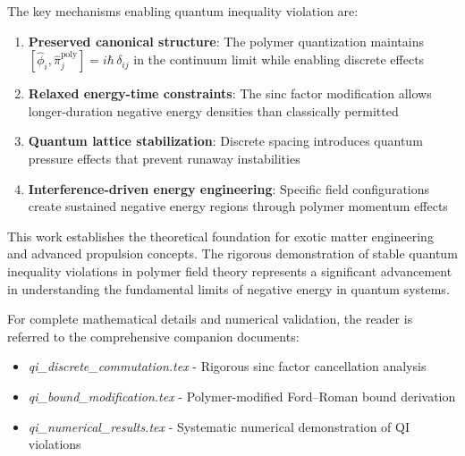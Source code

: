 \documentclass[12pt]{article}
\begin{document}
The key mechanisms enabling quantum inequality violation are:

\begin{enumerate}
\item \textbf{Preserved canonical structure}: The polymer quantization maintains $[\hat{\phi}_i, \hat{\pi}_j^{\text{poly}}] = i\hbar\,\delta_{ij}$ in the continuum limit while enabling discrete effects
\item \textbf{Relaxed energy-time constraints}: The sinc factor modification allows longer-duration negative energy densities than classically permitted
\item \textbf{Quantum lattice stabilization}: Discrete spacing introduces quantum pressure effects that prevent runaway instabilities
\item \textbf{Interference-driven energy engineering}: Specific field configurations create sustained negative energy regions through polymer momentum effects
\end{enumerate}

This work establishes the theoretical foundation for exotic matter engineering and advanced propulsion concepts. The rigorous demonstration of stable quantum inequality violations in polymer field theory represents a significant advancement in understanding the fundamental limits of negative energy in quantum systems.

For complete mathematical details and numerical validation, the reader is referred to the comprehensive companion documents:
\begin{itemize}
\item \textit{qi\_discrete\_commutation.tex} - Rigorous sinc factor cancellation analysis
\item \textit{qi\_bound\_modification.tex} - Polymer-modified Ford–Roman bound derivation
\item \textit{qi\_numerical\_results.tex} - Systematic numerical demonstration of QI violations
\end{itemize}
\end{document}
